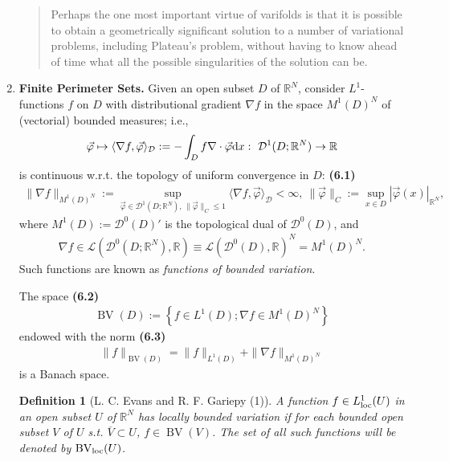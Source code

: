 \documentclass{book}
\numberwithin{equation}{section}
\newtheorem{definition}{Definition}[section]
\begin{document}
\begin{enumerate}
    \begin{quotation}
        Perhaps the one most important virtue of varifolds is that it is possible to obtain a geometrically significant solution to a number of variational problems, including Plateau's problem, without having to know ahead of time what all the possible singularities of the solution can be.
    \end{quotation}
    \item \textbf{Finite Perimeter Sets.} Given an open subset $D$ of $\mathbb{R}^N$, consider $L^1$-functions $f$ on $D$ with distributional gradient $\nabla f$ in the space $M^1(D)^N$ of (vectorial) bounded measures; i.e.,
    \begin{align*}
        \vec{\varphi}\mapsto\langle\nabla f,\vec{\varphi}\rangle_{\mathcal{D}} := -\int_D f\nabla\cdot\vec{\varphi}{\rm d}x:\ \mathcal{D}^1(D;\mathbb{R}^N)\to\mathbb{R}
    \end{align*}
    is continuous w.r.t. the topology of uniform convergence in $D$: \textbf{(6.1)}
    \begin{align*}
        \|\nabla f\|_{M^1(D)^N} := \sup_{\vec{\varphi}\in\mathcal{D}^1(D;\mathbb{R}^N),\,\|\vec{\varphi}\|_C\le 1} \langle\nabla f,\vec{\varphi}\rangle_{\mathcal{D}} < \infty,\ \|\vec{\varphi}\|_C := \sup_{x\in D} |\vec{\varphi}(x)|_{\mathbb{R}^N},
    \end{align*}
    where $M^1(D) := \mathcal{D}^0(D)'$ is the topological dual of $\mathcal{D}^0(D)$, and
    \begin{align*}
        \nabla f\in\mathcal{L}(\mathcal{D}^0(D;\mathbb{R}^N),\mathbb{R})\equiv\mathcal{L}(\mathcal{D}^0(D),\mathbb{R})^N = M^1(D)^N.
    \end{align*}
    Such functions are known as \textit{functions of bounded variation}.
    
    The space \textbf{(6.2)}
    \begin{align*}
        \operatorname{BV}(D) := \left\{f\in L^1(D);\nabla f\in M^1(D)^N\right\}
    \end{align*}
    endowed with the norm \textbf{(6.3)}
    \begin{align*}
        \|f\|_{\operatorname{BV}(D)} = \|f\|_{L^1(D)} + \|\nabla f\|_{M^1(D)^N}
    \end{align*}
    is a Banach space.
    
    \begin{definition}[L. C. Evans and R. F. Gariepy (1)]
        A function $f\in L_{\rm loc}^1(U)$ in an open subset $U$ of $\mathbb{R}^N$ has \emph{locally bounded variation} if for each bounded open subset $V$ of $U$ s.t. $\overline{V}\subset U$, $f\in\operatorname{BV}(V)$. The set of all such functions will be denoted by $\operatorname{BV}_{\rm loc}(U)$.
    \end{definition}
    

\end{enumerate}
\end{document}
